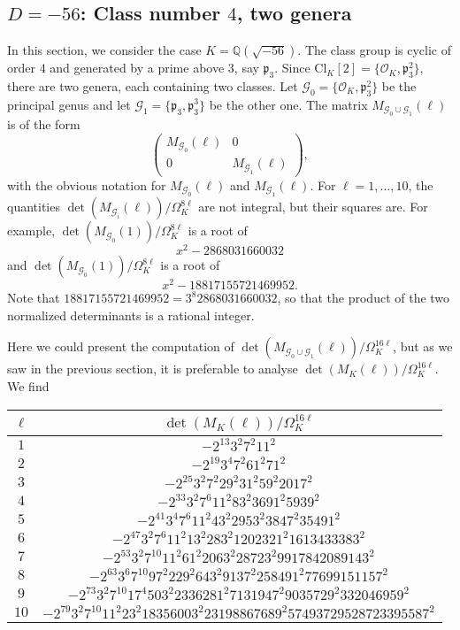 \documentclass[twoside,10pt]{article}
\newcommand{\Q}{\mathbb{Q}}
\newcommand{\p}{\mathfrak{p}}
\newcommand{\Clk}{\text{Cl}_K}
\renewcommand{\O}{\mathcal{O}}
\begin{document}
\subsection{$D=-56$: Class number $4$, two genera}
In this section, we consider the case $K=\Q(\sqrt{-56})$. The class group is cyclic of order $4$ and generated by a prime above $3$, say $\p_3$. Since $\Clk[2]=\{\O_K,\p_3^2\}$, there are two genera, each containing two classes. Let $\mathcal{G}_0=\{\O_K,\p_3^2\}$ be the principal genus and let $\mathcal{G}_1=\{\p_3,\p_3^3\}$ be the other one. The matrix $M_{\mathcal{G}_0\cup\mathcal{G}_1}(\ell)$ is of the form
\[\begin{pmatrix}
M_{\mathcal{G}_0}(\ell) & 0 \\ 
0 & M_{\mathcal{G}_1}(\ell)
\end{pmatrix},\]
with the obvious notation for $M_{\mathcal{G}_0}(\ell)$ and $M_{\mathcal{G}_1}(\ell)$. For $\ell=1,\dots,10$, the quantities $\det(M_{\mathcal{G}_i}(\ell))/\Omega_K^{8\ell}$  are not integral, but their squares are. For example, $\det(M_{\mathcal{G}_0}(1))/\Omega_K^{8\ell}$ is a root of
\[x^2 - 2868031660032\]
and
$\det(M_{\mathcal{G}_0}(1))/\Omega_K^{8\ell}$ is a root of
\[x^2 - 18817155721469952.\]
Note that $18817155721469952=3^{8}2868031660032$, so that the product of the two normalized determinants is a rational integer.

Here we could present the computation of $\det(M_{\mathcal{G}_0\cup\mathcal{G}_1}(\ell))/\Omega_K^{16\ell}$, but as we saw in the previous section, it is preferable to analyse $\det(M_K(\ell))/\Omega_K^{16\ell}$. We find

\begin{tabular}{|c|c|}
\hline
$\ell$ & $\det(M_K(\ell))/\Omega_K^{16\ell}$ \\
\hline
$1$ & $-2^{13}3^{2}7^{2}11^{2}$ \\
\hline
$2$ & $-2^{19}3^{4}7^{2}61^{2}71^{2}$ \\ 
\hline
$3$ & $-2^{25}3^{2}7^{2}29^{2}31^{2}59^{2}2017^{2}$ \\ 
\hline
$4$ & $-2^{33}3^{2}7^{6}11^{2}83^{2}3691^{2}5939^{2}$ \\ 
\hline
$5$ & $-2^{41}3^{4}7^{6}11^{2}43^{2}2953^{2}3847^{2}35491^{2}$ \\ 
\hline
$6$ & $-2^{47}3^{2}7^{6}11^{2}13^{2}283^{2}1202321^{2}1613433383^{2}$ \\ 
\hline
$7$ & $-2^{53}3^{2}7^{10}11^{2}61^{2}2063^{2}28723^{2}9917842089143^{2}$ \\ 
\hline
$8$ & $-2^{63}3^{6}7^{10}97^{2}229^{2}643^{2}9137^{2}258491^{2}77699151157^{2}$ \\ 
\hline
$9$ & $-2^{73}3^{2}7^{10}17^{4}503^{2}2336281^{2}7131947^{2}9035729^{2}332046959^{2}$ \\ 
\hline
$10$ & $-2^{79}3^{2}7^{10}11^{2}23^{2}18356003^{2}23198867689^{2}57493729528723395587^{2}$ \\
\hline
\end{tabular}
\end{document}
